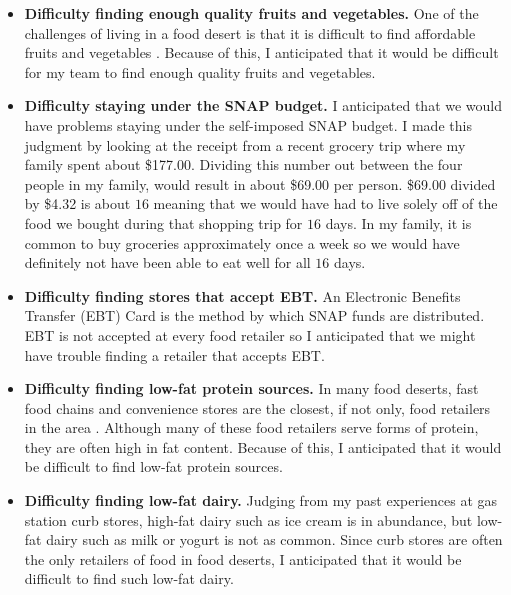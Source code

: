 \documentclass[11pt]{article}
\begin{document}
\begin{itemize}
    \item \textbf{Difficulty finding enough quality fruits and vegetables.} One of the challenges of
        living in a food desert is that it is difficult to find affordable fruits and vegetables
        \cite{cdc}. Because of this, I anticipated that it would be difficult for my team to find
        enough quality fruits and vegetables.

    \item \textbf{Difficulty staying under the SNAP budget.}  I anticipated that we would have
        problems staying under the self-imposed SNAP budget. I made this judgment by looking at the
        receipt from a recent grocery trip where my family spent about \$177.00. Dividing this
        number out between the four people in my family, would result in about \$69.00 per person.
        \$69.00 divided by \$4.32 is about $16$ meaning that we would have had to live solely off of
        the food we bought during that shopping trip for $16$ days. In my family, it is common to
        buy groceries approximately once a week so we would have definitely not have been able to
        eat well for all $16$ days.

    \item \textbf{Difficulty finding stores that accept EBT.} An Electronic Benefits Transfer (EBT)
        Card is the method by which SNAP funds are distributed. EBT is not accepted at every food
        retailer so I anticipated that we might have trouble finding a retailer that accepts EBT.

    \item \textbf{Difficulty finding low-fat protein sources.} In many food deserts, fast food
        chains and convenience stores are the closest, if not only, food retailers in the area
        \cite{gallagher}. Although many of these food retailers serve forms of protein, they are
        often high in fat content. Because of this, I anticipated that it would be difficult to find
        low-fat protein sources.

    \item \textbf{Difficulty finding low-fat dairy.} Judging from my past experiences at gas station
        curb stores, high-fat dairy such as ice cream is in abundance, but low-fat dairy such as
        milk or yogurt is not as common. Since curb stores are often the only retailers of food in
        food deserts, I anticipated that it would be difficult to find such low-fat dairy.


\end{itemize}
\end{document}
